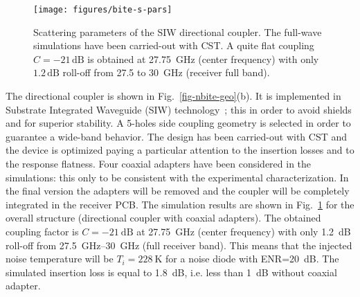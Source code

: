\documentclass[conference,10pt,a4paper]{IEEEtran}%
\begin{document}
\begin{figure}[tb]
	\centering
	\texttt{[image: figures/bite-s-pars]}
	\caption{
		Scattering parameters of the SIW directional coupler.
		The full-wave simulations have been carried-out with CST.
		A quite flat coupling $C=-21\,\mbox{dB}$ is obtained at 27.75~GHz (center frequency) with only $1.2\,\mbox{dB}$ roll-off from 27.5 to 30~GHz (receiver full band).
	}
	\label{fig-nbite-res}
\end{figure}
The directional coupler is shown in Fig.~\ref{fig-nbite-geo}(b).
It is implemented in Substrate Integrated Waveguide (SIW) technology~\cite{Doghri2015}; this in order to avoid shields and for superior stability.
A 5-holes side coupling geometry is selected in order to guarantee a wide-band behavior.
The design has been carried-out with CST and the device is optimized paying a particular attention to the insertion losses and to the response flatness.
Four coaxial adapters have been considered in the simulations: this only to be consistent with the experimental characterization.
In the final version the adapters will be removed and the coupler will be completely integrated in the receiver PCB.
The simulation results are shown in Fig.~\ref{fig-nbite-res} for the overall structure (directional coupler with coaxial adapters).
The obtained coupling factor is $C=\SI{-21}{\dB}$ at \SI{27.75}{\GHz} (center frequency) with only \SI{1.2}{\dB} roll-off from \SIrange{27.5}{30}{\GHz} (full receiver band).
This means that the injected noise temperature will be $T_i=\SI{228}{\kelvin}$ for a noise diode with ENR=\SI{20}{\dB}.
The simulated insertion loss is equal to \SI{1.8}{\dB}, i.e. less than \SI{1}{\dB} without coaxial adapter.
\end{document}
